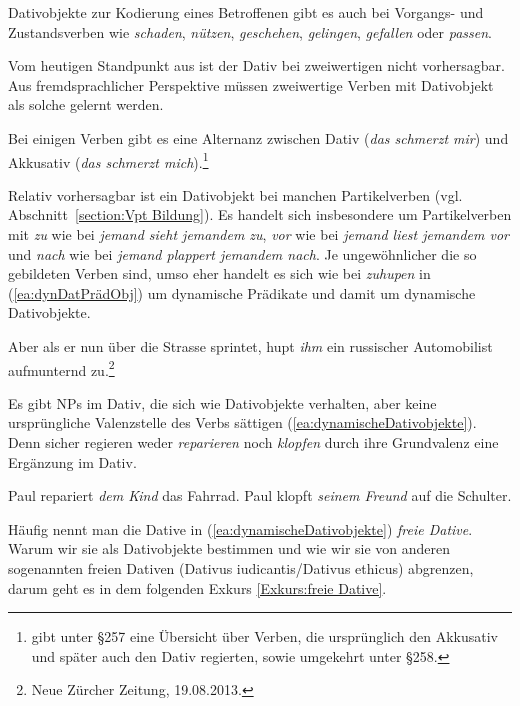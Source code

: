 Dativobjekte zur Kodierung eines Betroffenen gibt es auch bei Vorgangs- und Zustandsverben wie \textit{schaden}, \textit{nützen}, \textit{geschehen}, \textit{gelingen}, \textit{gefallen} oder \textit{passen}. 

Vom heutigen Standpunkt aus ist der Dativ bei zweiwertigen nicht vorhersagbar. Aus fremdsprachlicher Perspektive müssen zweiwertige Verben mit Dativobjekt als solche gelernt werden.

Bei einigen Verben gibt es eine Alternanz zwischen Dativ (\textit{das schmerzt mir}) und Akkusativ (\textit{das schmerzt mich}).\footnote{\citet[382--391]{Paul1919} gibt unter §257 eine Übersicht über Verben, die ursprünglich den Akkusativ und später auch den Dativ regierten, sowie umgekehrt unter §258.}   

Relativ vorhersagbar ist ein Dativobjekt bei manchen Partikelverben (vgl. Abschnitt~\ref{section:Vpt Bildung}). Es handelt sich insbesondere um Partikelverben mit \textit{zu} wie bei \textit{jemand sieht jemandem zu}, \textit{vor} wie bei \textit{jemand liest jemandem vor} und \textit{nach} wie bei \textit{jemand plappert jemandem nach}. Je ungewöhnlicher die so gebildeten Verben sind, umso eher handelt es sich wie bei \textit{zuhupen} in (\ref{ea:dynDatPrädObj}) um dynamische Prädikate und damit um dynamische Dativobjekte.

\ea \label{ea:dynDatPrädObj} Aber als er nun über die Strasse sprintet, hupt \textit{ihm} ein russischer Automobilist aufmunternd zu.\footnote{Neue Zürcher Zeitung, 19.08.2013.} 
\z 


Es gibt NPs im Dativ, die sich wie Dativobjekte verhalten, aber keine ursprüngliche Valenzstelle des Verbs sättigen (\ref{ea:dynamischeDativobjekte}). Denn sicher regieren weder \textit{reparieren} noch \textit{klopfen} durch ihre Grundvalenz eine Ergänzung im Dativ.  

\ea \label{ea:dynamischeDativobjekte}
\ea \label{ea:reaprierenDAT} Paul repariert \textit{dem Kind} das Fahrrad.
\ex \label{ex:klopfenPERTDAT} Paul klopft \textit{seinem Freund} auf die Schulter.
\z 
\z 

Häufig nennt man die Dative in (\ref{ea:dynamischeDativobjekte}) \textit{freie Dative}. Warum wir sie als Dativobjekte bestimmen und wie wir sie von anderen sogenannten freien Dativen (Dativus iudicantis/Dativus ethicus) abgrenzen, darum geht es in dem folgenden Exkurs \ref{Exkurs:freie Dative}. 

